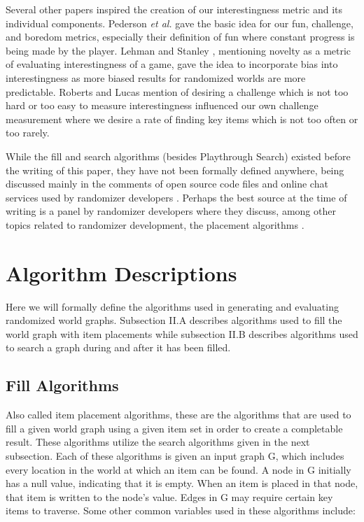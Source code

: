 \documentclass{ieeeaccess}
\begin{document}
Several other papers inspired the creation of our interestingness metric and its individual
components. Pederson {\it et al.} \cite{b6} gave the basic idea for our fun, challenge, and
boredom metrics, especially their definition of fun where constant progress is being made by the
player. Lehman and Stanley \cite{b7}, mentioning novelty as a metric of evaluating
interestingness of a game, gave the idea to incorporate bias into interestingness as more biased
results for randomized worlds are more predictable. Roberts and Lucas \cite{b8} mention of
desiring a challenge which is not too hard or too easy to measure interestingness influenced our
own challenge measurement where we desire a rate of finding key items which is not too often or
too rarely.

While the fill and search algorithms (besides Playthrough Search) existed before the writing of
this paper, they have not been formally defined anywhere, being discussed mainly in the comments
of open source code files and online chat services used by randomizer developers \cite{b9}
\cite{b10}. Perhaps the best source at the time of writing is a panel by randomizer developers
where they discuss, among other topics related to randomizer development, the placement
algorithms \cite{b11}. 


\section{Algorithm Descriptions}
Here we will formally define the algorithms used in generating and evaluating randomized world
graphs. Subsection II.A describes algorithms used to fill the world graph with item placements
while subsection II.B describes algorithms used to search a graph during and after it has been
filled. 

\subsection{Fill Algorithms}

Also called item placement algorithms, these are the algorithms that are used to fill a given
world graph using a given item set in order to create a completable result. These algorithms
utilize the search algorithms given in the next subsection. Each of these algorithms is given an
input graph G, which includes every location in the world at which an item can be found. A node
in G initially has a null value, indicating that it is empty. When an item is placed in that
node, that item is written to the node's value. Edges in G may require certain key items to
traverse. Some other common variables used in these algorithms include:
\end{document}
